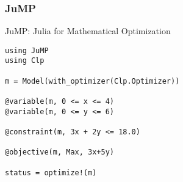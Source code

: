 \documentclass[usepdftitle=false]{beamer}
\begin{document}
\begin{frame}[fragile]
\frametitle{JuMP}

JuMP: Julia for Mathematical Optimization

\begin{verbatim}
using JuMP
using Clp

m = Model(with_optimizer(Clp.Optimizer))

@variable(m, 0 <= x <= 4)
@variable(m, 0 <= y <= 6)

@constraint(m, 3x + 2y <= 18.0)

@objective(m, Max, 3x+5y)

status = optimize!(m)
\end{verbatim}

\end{frame}
\end{document}
